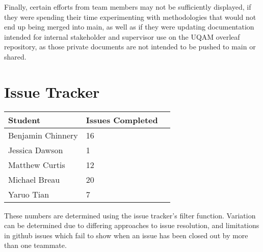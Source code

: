 \documentclass{article}
\begin{document}
Finally, certain efforts from team members may not be sufficiently displayed, if they were spending their time experimenting with methodologies that would not end up being merged into main, as well as if they were updating documentation intended for internal stakeholder and supervisor use on the UQAM overleaf repository, as those private documents are not intended to be pushed to main or shared.



\section{Issue Tracker}

\begin{table}[H]
\centering
\begin{tabular}{lll}
\toprule
\textbf{Student} & \textbf{Issues Completed}\\
\midrule
Benjamin Chinnery & 16 \\
Jessica Dawson& 1 \\
Matthew Curtis & 12 \\
Michael Breau & 20 \\
Yaruo Tian & 7 \\
\bottomrule
\end{tabular}
\end{table}

These numbers are determined using the issue tracker's filter function. Variation can be determined due to differing approaches to issue resolution, and limitations in github issues which fail to show when an issue has been closed out by more than one teammate.
\end{document}
